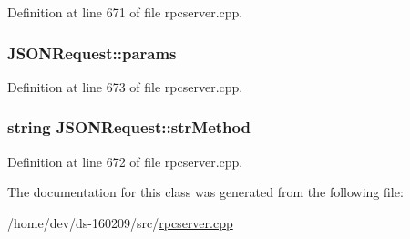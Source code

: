 Definition at line 671 of file rpcserver.\+cpp.

\hypertarget{class_j_s_o_n_request_a92b1bcc9caa57cec01ccdb498a2b3666}{}
\subsubsection[{params}]{ J\+S\+O\+N\+Request\+::params}\label{class_j_s_o_n_request_a92b1bcc9caa57cec01ccdb498a2b3666}


Definition at line 673 of file rpcserver.\+cpp.

\hypertarget{class_j_s_o_n_request_ace58495b259be69fb4b6e256a42c9d5f}{}
\subsubsection[{str\+Method}]{\setlength{\rightskip}{0pt plus 5cm}string J\+S\+O\+N\+Request\+::str\+Method}\label{class_j_s_o_n_request_ace58495b259be69fb4b6e256a42c9d5f}


Definition at line 672 of file rpcserver.\+cpp.



The documentation for this class was generated from the following file\+:\begin{DoxyCompactItemize}
\item 
/home/dev/ds-\/160209/src/\hyperlink{rpcserver_8cpp}{rpcserver.\+cpp}\end{DoxyCompactItemize}
